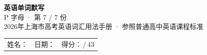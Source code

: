 \documentclass[10pt,a4paper]{article}
\begin{document}
\pagestyle{plain}

\begin{center}
{\LARGE\bfseries 英语单词默写}\\[0.22em]
{\large P 字母 · 第 7 / 7 份}\\[0.18em]
{\small 2026年上海市高考英语词汇用法手册 · 参照普通高中英语课程标准}
\end{center}

\vspace{0.25em}
\noindent\begin{tabular}{@{}p{}@{}p{}@{}p{}@{}}
姓名：\underline{\hspace{2.0cm}} & 日期：\underline{\hspace{2.0cm}} & 得分：\underline{\hspace{1.3cm}}\,/\,43 \\
\end{tabular}

\vspace{0.3em}

\vspace{0.08em}
\end{document}
